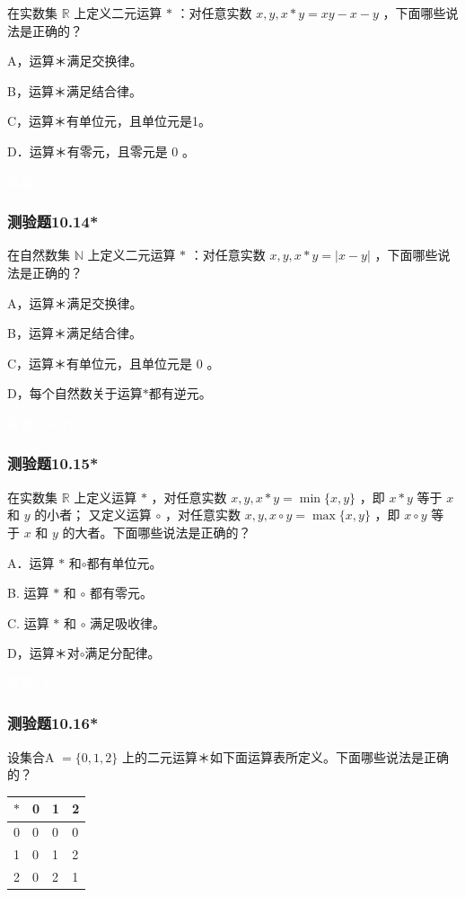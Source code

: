 \documentclass[UTF8, heading=true]{ctexart}
\begin{document}
在实数集 $\mathbb{R}$ 上定义二元运算 $*$ ：对任意实数 $x, y, x * y=x y-x-y$ ，下面哪些说法是正确的？

A，运算＊满足交换律。

B，运算＊满足结合律。

C，运算＊有单位元，且单位元是1。

D．运算＊有零元，且零元是 0 。

\textcolor{white}{答案：A}

\subsubsection{测验题10.14*}

在自然数集 $\mathbb{N} $ 上定义二元运算 $*$ ：对任意实数 $x, y, x * y=|x-y|$ ，下面哪些说法是正确的？

A，运算＊满足交换律。

B，运算＊满足结合律。

C，运算＊有单位元，且单位元是 0 。

D，每个自然数关于运算$*$都有逆元。

\textcolor{white}{答案：ACD}

\subsubsection{测验题10.15*}

在实数集 $\mathbb{R}$ 上定义运算 $*$ ，对任意实数 $x, y, x * y=\min \{x, y\}$ ，即 $x * y$ 等于 $x$ 和 $y$ 的小者；
又定义运算 $\circ$ ，对任意实数 $x, y, x \circ y=\max \{x, y\}$ ，即 $x \circ y$ 等
于 $x$ 和 $y$ 的大者。下面哪些说法是正确的？

A．运算 $*$ 和$\circ$都有单位元。

B. 运算 $*$ 和 $\circ$ 都有零元。

C. 运算 $*$ 和 $\circ$ 满足吸收律。

D，运算＊对$\circ$满足分配律。

\textcolor{white}{答案：CD}

\subsubsection{测验题10.16*}

设集合A $=\{0,1,2\}$ 上的二元运算＊如下面运算表所定义。下面哪些说法是正确的？

\begin{table}[H]
  \renewcommand{\arraystretch}{1.5}
  \centering
\begin{tabular}{l|lll}
\hline$*$ & 0 & 1 & 2 \\
\hline 0 & 0 & 0 & 0 \\
1 & 0 & 1 & 2 \\
2 & 0 & 2 & 1 \\
\hline
\end{tabular}
\end{table}
\end{document}
